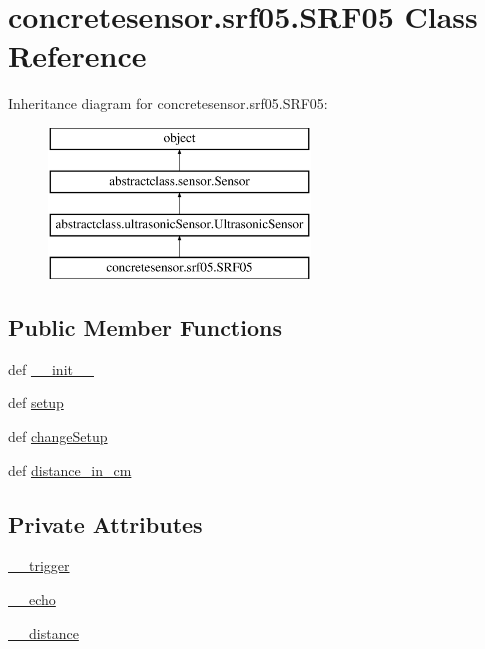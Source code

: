 \hypertarget{classconcretesensor_1_1srf05_1_1SRF05}{}\section{concretesensor.\+srf05.\+S\+R\+F05 Class Reference}
\label{classconcretesensor_1_1srf05_1_1SRF05}
Inheritance diagram for concretesensor.\+srf05.\+S\+R\+F05\+:\begin{figure}[H]
\begin{center}
\leavevmode
\includegraphics[height=4.000000cm]{classconcretesensor_1_1srf05_1_1SRF05}
\end{center}
\end{figure}
\subsection*{Public Member Functions}
\begin{DoxyCompactItemize}
\item 
def \hyperlink{classconcretesensor_1_1srf05_1_1SRF05_a08c60e9268d97f997143a3a11bcd7585}{\+\_\+\+\_\+init\+\_\+\+\_\+}
\item 
def \hyperlink{classconcretesensor_1_1srf05_1_1SRF05_a8acaf2d197610c53b414e6c350cf960e}{setup}
\item 
def \hyperlink{classconcretesensor_1_1srf05_1_1SRF05_af97e4e18daa443a7fd1af48799e6dbc6}{change\+Setup}
\item 
def \hyperlink{classconcretesensor_1_1srf05_1_1SRF05_a69bf73e7f57647561b1db6f7f1eeccb4}{distance\+\_\+in\+\_\+cm}
\end{DoxyCompactItemize}
\subsection*{Private Attributes}
\begin{DoxyCompactItemize}
\item 
\hyperlink{classconcretesensor_1_1srf05_1_1SRF05_a83d96daa9f2c43feb179e6b746fa1f7f}{\+\_\+\+\_\+trigger}
\item 
\hyperlink{classconcretesensor_1_1srf05_1_1SRF05_a65c7bd9d4f1ba4a4c7e0fd51b20eb7c2}{\+\_\+\+\_\+echo}
\item 
\hyperlink{classconcretesensor_1_1srf05_1_1SRF05_a4b4ad0d8fee78ff2c03f0f39a794fbb0}{\+\_\+\+\_\+distance}
\end{DoxyCompactItemize}


